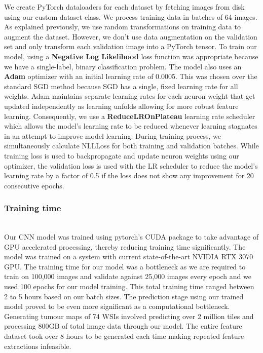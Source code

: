 \documentclass{l4proj}
\begin{document}
We create PyTorch dataloaders for each dataset by fetching images from disk using our custom dataset class. We process training data in batches of 64 images. As explained previously, we use random transformations on training data to augment the dataset. However, we don't use data augmentation on the validation set and only transform each validation image into a PyTorch tensor. To train our model, using a \textbf{Negative Log Likelihood} loss function was appropriate because we have a single-label, binary classification problem. The model also uses an \textbf{Adam} optimizer with an initial learning rate of 0.0005. This was chosen over the standard SGD method because SGD has a single, fixed learning rate for all weights. Adam maintains separate learning rates for each neuron weight that get updated independently as learning unfolds allowing for more robust feature learning. Consequently, we use a \textbf{ReduceLROnPlateau} learning rate scheduler which allows the model's learning rate to be reduced whenever learning stagnates in an attempt to improve model learning. During training process, we simultaneously calculate NLLLoss for both training and validation batches. While training loss is used to backpropagate and update neuron weights using our optimizer, the validation loss is used with the LR scheduler to reduce the model's learning rate by a factor of 0.5 if the loss does not show any improvement for 20 consecutive epochs. 
\\
\subsubsection{Training time}\hfill\\
Our CNN model was trained using pytorch's CUDA package to take advantage of GPU accelerated processing, thereby reducing training time significantly. The model was trained on a system with current state-of-the-art NVIDIA RTX 3070 GPU. The training time for our model was a bottleneck as we are required to train on 100,000 images and validate against 25,000 images every epoch and we used 100 epochs for our model training. This total training time ranged between 2 to 5 hours based on our batch sizes.
The prediction stage using our trained model proved to be even more significant as a computational bottleneck. Generating tumour maps of 74 WSIs involved predicting over 2 million tiles and processing 800GB of total image data through our model. The entire feature dataset took over 8 hours to be generated each time making repeated feature extractions infeasible.
\\
\end{document}
